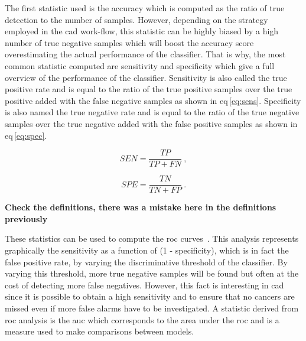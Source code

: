 The first statistic used is the accuracy which is computed as the ratio of true detection to the number of samples.
However, depending on the strategy employed in the \ac{cad} work-flow, this statistic can be highly biased by a high number of true negative samples which will boost the accuracy score overestimating the actual performance of the classifier.
That is why, the most common statistic computed are sensitivity and specificity which give a full overview of the performance of the classifier.
Sensitivity is also called the true positive rate and is equal to the ratio of the true positive samples over the true positive added with the false negative samples as shown in \acs{eq}\,\eqref{eq:sens}.
Specificity is also named the true negative rate and is equal to the ratio of the true negative samples over the true negative added with the false positive samples as shown in \acs{eq}\,\eqref{eq:spec}.

\begin{equation}
  SEN = \frac{TP}{TP+FN} \ ,
  \label{eq:sens}
\end{equation}

\begin{equation}
  SPE = \frac{TN}{TN+FP} \ .
  \label{eq:spec}
\end{equation}

{\color{red} \textbf{Check the definitions, there was a mistake here in the definitions previously}}

These statistics can be used to compute the \acf{roc} curves~\cite{Metz2006}.
This analysis represents graphically the sensitivity as a function of (1 - specificity), which is in fact the false positive rate, by varying the discriminative threshold of the classifier.
By varying this threshold, more true negative samples will be found but often at the cost of detecting more false negatives.
However, this fact is interesting in \ac{cad} since it is possible to obtain a high sensitivity and to ensure that no cancers are missed even if more false alarms have to be investigated.
A statistic derived from \ac{roc} analysis is the \acf{auc} which corresponds to the area under the \ac{roc} and is a measure used to make comparisons between models.

